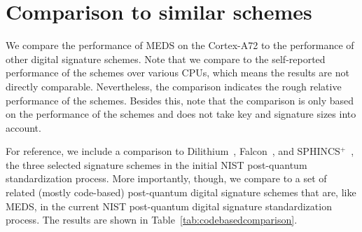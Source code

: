 \documentclass[11pt,a4paper]{report}
\theoremstyle{definition}
\begin{document}
\section{Comparison to similar schemes}
\label{sec:comparison}
We compare the performance of MEDS on the Cortex-A72 to the performance of other digital signature schemes. Note that we compare to the self-reported performance of the schemes over various CPUs, which means the results are not directly comparable. Nevertheless, the comparison indicates the rough relative performance of the schemes. Besides this, note that the comparison is only based on the performance of the schemes and does not take key and signature sizes into account.

For reference, we include a comparison to Dilithium~\cite{ducas2018crystals}, Falcon~\cite{fouque2018falcon}, and SPHINCS$^+$~\cite{aumasson2022sphincs}, the three selected signature schemes in the initial NIST post-quantum standardization process. More importantly, though, we compare to a set of related (mostly code-based) post-quantum digital signature schemes that are, like MEDS, in the current NIST post-quantum digital signature standardization process. The results are shown in Table~\ref{tab:codebasedcomparison}.
\end{document}
